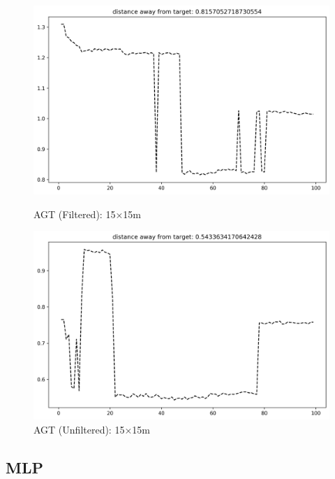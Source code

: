 \documentclass[runningheads]{llncs}
\begin{document}
\begin{figure}[H]
	\centering
	\begin{minipage}{0.49\textwidth}
		\centering
		\includegraphics[width=\textwidth]{figures/filtered/knn_custom_15.png}
		\caption*{AGT (Filtered): 15×15m}
	\end{minipage}
	\hfill
	\begin{minipage}{0.49\textwidth}
		\centering
		\includegraphics[width=\textwidth]{figures/unfiltered/knn_custom_15.png}
		\caption*{AGT (Unfiltered): 15×15m}
	\end{minipage}
\end{figure}

\clearpage

\subsection*{MLP}
\end{document}
